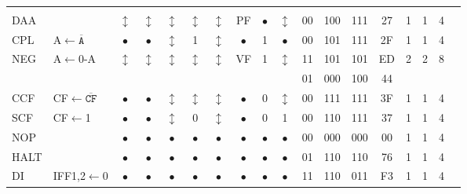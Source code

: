 \documentclass[oneside,a4paper]{book}
\begin{document}
{\tt \scriptsize \setlength{\fboxsep}{0.25mm}
	\setlength{\tabcolsep}{1mm}
	\begin{tabular}{llcccccccccccccccl}
		     
		\instrheader

	& & & & & & & & & & & & & & & & & \\

		DAA & & 
			$\updownarrow$ & $\updownarrow$ & $\updownarrow$ & $\updownarrow$ & $\updownarrow$ & PF & $\bullet$ & $\updownarrow$ &
			00 & 100 & 111 & 
			27 & 1 & 
			1 & 4 & \\[4pt]

		CPL & A$\leftarrow\mathtt{\overline{A}}$ & 
			$\bullet$ & $\bullet$ & $\updownarrow$ & 1 & $\updownarrow$ & $\bullet$ & 1 & $\bullet$ & 
			00 & 101 & 111 & 
			2F & 1 & 
			1 & 4 & \\[4pt]

		NEG & A$\leftarrow$0-A & 
			$\updownarrow$ & $\updownarrow$ & $\updownarrow$ & $\updownarrow$ & $\updownarrow$ & VF & 1 & $\updownarrow$ &
			11 & 101 & 101 & 
			ED & 2 & 
			2 & 8 & \\
		\multicolumn{10}{c}{} & 01 & 000 & 100 & 44 & \\[4pt]

		CCF & CF$\leftarrow\mathtt{\overline{CF}}$ & 
			$\bullet$ & $\bullet$ & 
				$\updownarrow$\footnotemark[1] & 
				$\updownarrow$\footnotemark[2] & 
				$\updownarrow$\footnotemark[1] & 
			$\bullet$ & 0 & $\updownarrow$ & 
			00 & 111 & 111 & 
			3F & 1 & 
			1 & 4 & \\[4pt]

		SCF & CF$\leftarrow$1 & 
			$\bullet$ & $\bullet$ & $\updownarrow$\footnotemark[1] & 0 & $\updownarrow$\footnotemark[1] & $\bullet$ & 0 & 1 & 
			00 & 110 & 111 & 
			37 & 1 & 
			1 & 4 & \\[4pt]

		NOP & & 
			$\bullet$ & $\bullet$ & $\bullet$ & $\bullet$ & $\bullet$ & $\bullet$ & $\bullet$ & $\bullet$ &
			00 & 000 & 000 & 
			00 & 1 & 
			1 & 4 & \\[4pt]

		HALT & & 
			$\bullet$ & $\bullet$ & $\bullet$ & $\bullet$ & $\bullet$ & $\bullet$ & $\bullet$ & $\bullet$ &
			01 & 110 & 110 & 
			76 & 1 & 
			1 & 4 & \\[4pt]

		DI\footnotemark[3] & IFF1,2$\leftarrow$0 & 
			$\bullet$ & $\bullet$ & $\bullet$ & $\bullet$ & $\bullet$ & $\bullet$ & $\bullet$ & $\bullet$ &
			11 & 110 & 011 & 
			F3 & 1 & 
			1 & 4 & \\[4pt]


\end{tabular}}
\end{document}
